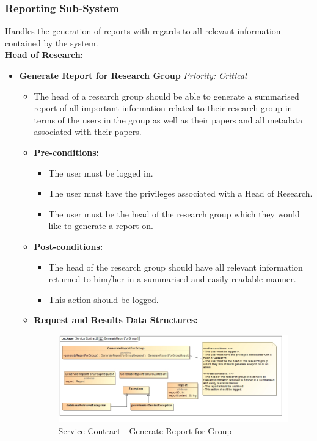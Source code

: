 \documentclass{article}
\begin{document}
			\cleardoublepage
			\subsubsection{Reporting Sub-System}\label{subsubsec:report}
				Handles the generation of reports with regards to all relevant information contained by the system.\\
				[3mm]
				\textbf{Head of Research:}
				\begin{itemize}
					\item \textbf{Generate Report for Research Group} \hfill \textit{Priority: Critical}
					\begin{itemize}
						\item The head of a research group should be able to generate a summarised report of all important information related to their research group in terms of the users in the group as well as their papers and all metadata associated with their papers.
						\item \textbf{Pre-conditions:}
						\begin{itemize}
							\item The user must be logged in.
							\item The user must have the privileges associated with a Head of Research.
							\item The user must be the head of the research group which they would like to generate a report on.
						\end{itemize}
						\item \textbf{Post-conditions:}
						\begin{itemize}
							\item The head of the research group should have all relevant information returned to him/her in a summarised and easily readable manner.
							\item This action should be logged.
						\end{itemize}
						\item \textbf{Request and Results Data Structures:}
						\begin{figure}[H]
							\includegraphics[width=\linewidth]{../Diagrams/ServiceContracts/Reporting subsystem/GenerateReportForGroup.jpg}
							\caption{Service Contract - Generate Report for Group}
						\end{figure}
					\end{itemize}
				\end{itemize}
				
\end{document}
